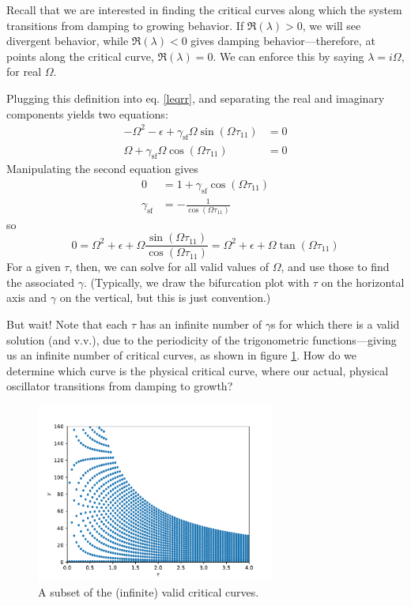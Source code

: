 \documentclass{article}
\newcommand{\self}{{\text{sf}}}
\begin{document}
    Recall that we are interested in finding the critical curves along which the system transitions from damping to growing behavior. If $\Re(\lambda) > 0$, we will see divergent behavior, while $\Re(\lambda) < 0$ gives damping behavior---therefore, at points along the critical curve, $\Re(\lambda) = 0$. We can enforce this by saying $\lambda = i \Omega$, for real $\Omega$.

    Plugging this definition into eq. \ref{leqrr}, and separating the real and imaginary components yields two equations:
    \begin{align*}
        -\Omega^2 - \epsilon + \gamma_{\self}\Omega\sin(\Omega \tau_{11}) &= 0 \\
        \Omega + \gamma_\self\Omega \cos(\Omega \tau_{11}) &= 0
    \end{align*}
    Manipulating the second equation gives
    \begin{align*}
        0 &= 1 + \gamma_\self\cos(\Omega \tau_{11}) \\
        \gamma_\self &= -\frac{1}{\cos(\Omega \tau_{11})}
    \end{align*}
    so
    \begin{equation*}
        0 = \Omega^2 + \epsilon + \Omega\frac{\sin(\Omega \tau_{11})}{\cos(\Omega \tau_{11})} 
        = \Omega^2 + \epsilon + \Omega\tan(\Omega\tau_{11})
    \end{equation*}
    For a given $\tau$, then, we can solve for all valid values of $\Omega$, and use those to find the associated $\gamma$. (Typically, we draw the bifurcation plot with $\tau$ on the horizontal axis and $\gamma$ on the vertical, but this is just convention.)
    
    But wait! Note that each $\tau$ has an infinite number of $\gamma$s for which there is a valid solution (and v.v.), due to the periodicity of the trigonometric functions---giving us an infinite number of critical curves, as shown in figure \ref{omegas}. How do we determine which curve is the physical critical curve, where our actual, physical oscillator transitions from damping to growth?

    \begin{figure}[ht]
        \centering
        \includegraphics[width=0.7\textwidth]{figs/omegas.pdf}
        \caption{A subset of the (infinite) valid critical curves.}
        \label{omegas}
    \end{figure}
\end{document}
